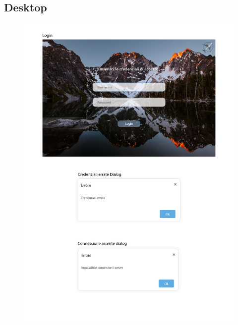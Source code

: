 \subsection{Desktop}
\begin{figure}[h!]
    \includegraphics[width=\textwidth]{Figures/LoginDesktop.png}
\end{figure}
